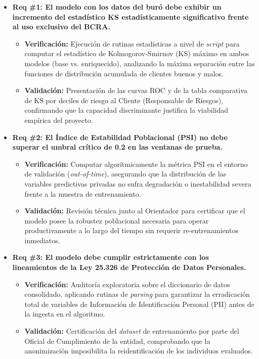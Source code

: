 \documentclass[
11pt, %
]{charter}
\begin{document}
\begin{itemize}

    \item \textbf{Req \#1: El modelo con los datos del buró debe exhibir un incremento del estadístico KS estadísticamente significativo frente al uso exclusivo del BCRA.}
    \begin{itemize}
        \item \textbf{Verificación:} Ejecución de rutinas estadísticas a nivel de \textit{script} para computar el estadístico de Kolmogorov-Smirnov (KS) máximo en ambos modelos (base vs. enriquecido), analizando la máxima separación entre las funciones de distribución acumulada de clientes buenos y malos.
        \item \textbf{Validación:} Presentación de las curvas ROC y de la tabla comparativa de KS por deciles de riesgo al Cliente (Responsable de Riesgos), confirmando que la capacidad discriminante justifica la viabilidad empírica del proyecto.
    \end{itemize}

    \item \textbf{Req \#2: El Índice de Estabilidad Poblacional (PSI) no debe superar el umbral crítico de 0.2 en las ventanas de prueba.}
    \begin{itemize}
        \item \textbf{Verificación:} Computar algorítmicamente la métrica PSI en el entorno de validación (\textit{out-of-time}), asegurando que la distribución de las variables predictivas privadas no sufra degradación o inestabilidad severa frente a la muestra de entrenamiento.
        \item \textbf{Validación:} Revisión técnica junto al Orientador para certificar que el modelo posee la robustez poblacional necesaria para operar productivamente a lo largo del tiempo sin requerir re-entrenamientos inmediatos.
    \end{itemize}

    \item \textbf{Req \#3: El modelo debe cumplir estrictamente con los lineamientos de la Ley 25.326 de Protección de Datos Personales.}
    \begin{itemize}
        \item \textbf{Verificación:} Auditoría exploratoria sobre el diccionario de datos consolidado, aplicando rutinas de \textit{parsing} para garantizar la erradicación total de variables de Información de Identificación Personal (PII) antes de la ingesta en el algoritmo.
        \item \textbf{Validación:} Certificación del \textit{dataset} de entrenamiento por parte del Oficial de Cumplimiento de la entidad, comprobando que la anonimización imposibilita la reidentificación de los individuos evaluados.
    \end{itemize}


\end{itemize}
\end{document}
